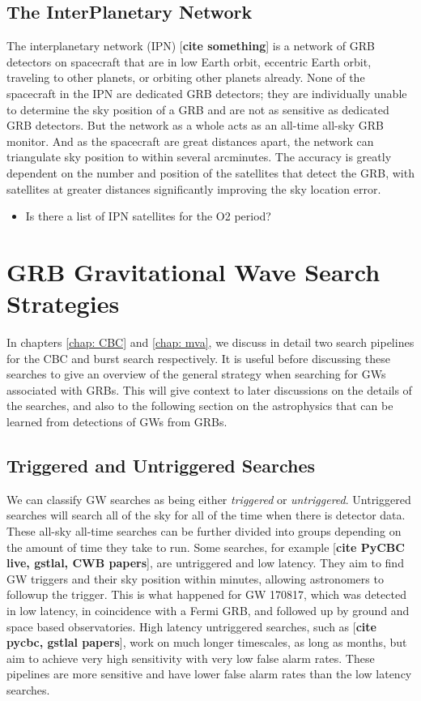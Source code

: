 \documentclass[11pt]{cuthesis}
\begin{document}
\subsection{The InterPlanetary Network}
The interplanetary network (IPN) [\textbf{cite something}] is a network of GRB detectors on spacecraft that are in low Earth orbit, eccentric Earth orbit, traveling to other planets, or orbiting other planets already. None of the spacecraft in the IPN are dedicated GRB detectors; they are individually unable to determine the sky position of a GRB and are not as sensitive as dedicated GRB detectors. But the network as a whole acts as an all-time all-sky GRB monitor. And as the spacecraft are great distances apart, the network can triangulate sky position to within several arcminutes. The accuracy is greatly dependent on the number and position of the satellites that detect the GRB, with satellites at greater distances significantly improving the sky location error.

\begin{itemize}
\item Is there a list of IPN satellites for the O2 period?
\end{itemize}

\section{GRB Gravitational Wave Search Strategies}
In chapters \ref{chap: CBC} and \ref{chap: mva}, we discuss in detail two search pipelines for the CBC and burst search respectively. It is useful before discussing these searches to give an overview of the general strategy when searching for GWs associated with GRBs. This will give context to later discussions on the details of the searches, and also to the following section on the astrophysics that can be learned from detections of GWs from GRBs. 

\subsection{Triggered and Untriggered Searches}
We can classify GW searches as being either \textit{triggered} or \textit{untriggered}. Untriggered searches will search all of the sky for all of the time when there is detector data. These all-sky all-time searches can be further divided into groups depending on the amount of time they take to run. Some searches, for example [\textbf{cite PyCBC live, gstlal, CWB papers}], are untriggered and low latency. They aim to find GW triggers and their sky position within minutes, allowing astronomers to followup the trigger. This is what happened for GW 170817, which was detected in low latency, in coincidence with a Fermi GRB, and followed up by ground and space based observatories. High latency untriggered  searches, such as [\textbf{cite pycbc, gstlal papers}], work on much longer timescales, as long as months, but aim to achieve very high sensitivity with very low false alarm rates. These pipelines are more sensitive and have lower false alarm rates than the low latency searches. 
\end{document}

